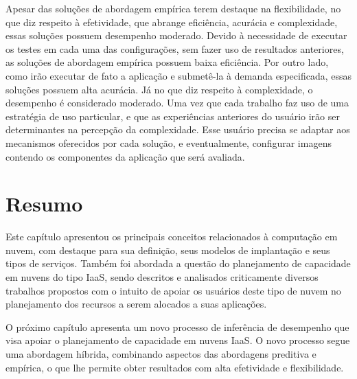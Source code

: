 Apesar das soluções de abordagem empírica terem destaque na flexibilidade, no que
diz respeito à efetividade, que abrange eficiência, acurácia e complexidade,
essas soluções possuem desempenho moderado. Devido à necessidade de executar os testes em
cada uma das configurações, sem fazer uso de resultados anteriores, as soluções
de abordagem empírica possuem baixa eficiência. Por outro lado, como irão
executar de fato a aplicação e submetê-la à demanda especificada, essas soluções
possuem alta acurácia. Já no que diz respeito à complexidade, o desempenho é
considerado moderado. Uma vez que cada trabalho faz uso de uma estratégia
de uso particular, e que as experiências anteriores do usuário irão ser
determinantes na percepção da complexidade. Esse usuário precisa se adaptar aos mecanismos oferecidos por cada solução, e eventualmente, configurar imagens contendo os
componentes da aplicação que será avaliada.

\section{Resumo}

Este capítulo apresentou os principais conceitos relacionados à computação em nuvem, com destaque para sua definição, seus modelos de implantação e seus tipos de serviços. Também foi abordada a questão do planejamento de capacidade em nuvens do tipo IaaS, sendo descritos e analisados criticamente diversos trabalhos propostos com o intuito de apoiar os usuários deste tipo de nuvem no planejamento dos recursos a serem alocados a suas aplicações.


O próximo capítulo apresenta um novo processo de inferência de desempenho que visa apoiar o planejamento de capacidade em nuvens IaaS. O novo processo segue uma abordagem híbrida, combinando aspectos das abordagens preditiva e empírica, o que lhe permite obter resultados com alta efetividade e flexibilidade. 







